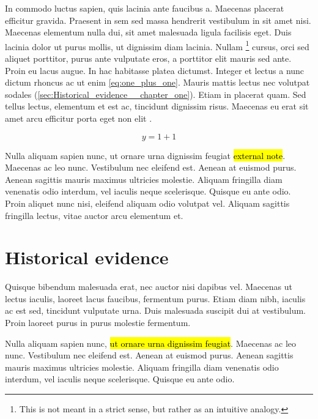 In commodo luctus sapien, quis lacinia ante faucibus a. Maecenas placerat efficitur gravida. Praesent in sem sed massa hendrerit vestibulum in sit amet nisi. Maecenas elementum nulla dui, sit amet malesuada ligula facilisis eget. Duis lacinia dolor ut purus mollis, ut dignissim diam lacinia. Nullam \footnote{ This is not meant in a strict sense, but rather as an intuitive analogy.
} cursus, orci sed aliquet porttitor, purus ante vulputate eros, a porttitor elit mauris sed ante. Proin eu lacus augue. In hac habitasse platea dictumst. Integer et lectus a nunc dictum rhoncus ac ut enim \autoref{eq:one_plus_one}. Mauris mattis lectus nec volutpat sodales (\autoref{sec:Historical_evidence__chapter_one}). Etiam in placerat quam. Sed tellus lectus, elementum et est ac, tincidunt dignissim risus. Maecenas eu erat sit amet arcu efficitur porta eget non elit \cite{Feline1999, Smooth2010}.

\begin{equation}
\label{eq:one_plus_one}
y = 1 + 1
\end{equation}

Nulla aliquam sapien nunc, ut ornare urna dignissim feugiat \hl{external note}. Maecenas ac leo nunc. Vestibulum nec eleifend est. Aenean at euismod purus. Aenean sagittis mauris maximus ultricies molestie. Aliquam fringilla diam venenatis odio interdum, vel iaculis neque scelerisque. Quisque eu ante odio. Proin aliquet nunc nisi, eleifend aliquam odio volutpat vel. Aliquam sagittis fringilla lectus, vitae auctor arcu elementum et. 


\section{Historical evidence}
\label{sec:Historical_evidence__chapter_one}
Quisque bibendum malesuada erat, nec auctor nisi dapibus vel. Maecenas ut lectus iaculis, laoreet lacus faucibus, fermentum purus. Etiam diam nibh, iaculis ac est sed, tincidunt vulputate urna. Duis malesuada suscipit dui at vestibulum. Proin laoreet purus in purus molestie fermentum.

\begin{displayquote}
 Nulla aliquam sapien nunc, \hl{ut ornare urna dignissim feugiat}. Maecenas ac leo nunc. Vestibulum nec eleifend est. Aenean at euismod purus. Aenean sagittis mauris maximus ultricies molestie. Aliquam fringilla diam venenatis odio interdum, vel iaculis neque scelerisque. Quisque eu ante odio.
\end{displayquote}

